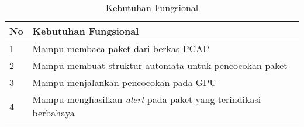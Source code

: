 \begin {table}[h]
\begin{center}
\caption {Kebutuhan Fungsional}
\begin{tabular}{|p{.5cm}|l|}

\hline
\rowcolor{gray!10}
No & Kebutuhan Fungsional \\
\hline

1 & Mampu membaca paket dari berkas PCAP \\
\hline

2 & Mampu membuat struktur automata untuk pencocokan paket \\
\hline

3 & Mampu menjalankan pencocokan pada GPU \\
\hline

4 & Mampu menghasilkan \emph{alert} pada paket yang terindikasi berbahaya \\
\hline

\end{tabular}
\end{center}
\end{table}
